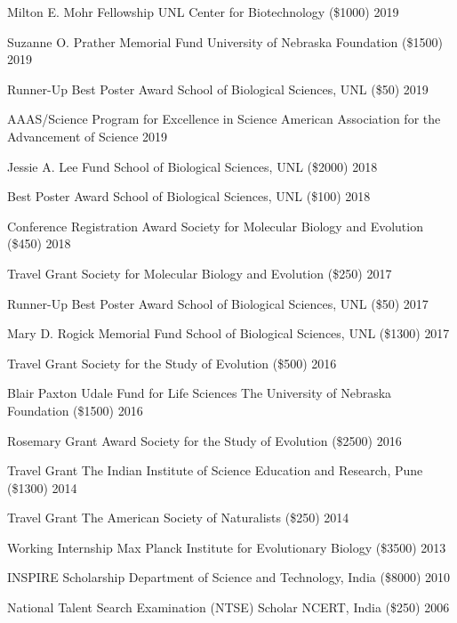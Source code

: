 
\begin{cvhonors}

  \cvhonor
    {Milton E. Mohr Fellowship}
    {UNL Center for Biotechnology (\$1000)}
    {2019}

  \cvhonor
    {Suzanne O. Prather Memorial Fund}
    {University of Nebraska Foundation (\$1500)}
    {2019}

  \cvhonor
    {Runner-Up Best Poster Award}
    {School of Biological Sciences, UNL (\$50)}
    {2019}

  \cvhonor
    {AAAS/Science Program for Excellence in Science}
    {American Association for the Advancement of Science}
    {2019}

  \cvhonor
    {Jessie A. Lee Fund} 
    {School of Biological Sciences, UNL (\$2000)}
    {2018} %

  \cvhonor
    {Best Poster Award}
    {School of Biological Sciences, UNL (\$100)}
    {2018}

  \cvhonor
    {Conference Registration Award}
    {Society for Molecular Biology and Evolution (\$450)}
    {2018}

  \cvhonor
    {Travel Grant}
    {Society for Molecular Biology and Evolution (\$250)}
    {2017}

  \cvhonor
    {Runner-Up Best Poster Award}
    {School of Biological Sciences, UNL (\$50)}
    {2017}

  \cvhonor
    {Mary D. Rogick Memorial Fund}
    {School of Biological Sciences, UNL (\$1300)}
    {2017}

  \cvhonor
    {Travel Grant}
    {Society for the Study of Evolution (\$500)}
    {2016}

  \cvhonor
    {Blair Paxton Udale Fund for Life Sciences}
    {The University of Nebraska Foundation (\$1500)}
    {2016}

  \cvhonor
    {Rosemary Grant Award}
    {Society for the Study of Evolution (\$2500)}
    {2016}

  \cvhonor
    {Travel Grant}
    {The Indian Institute of Science Education and Research, Pune (\$1300)}
    {2014}

  \cvhonor
    {Travel Grant}
    {The American Society of Naturalists (\$250)}
    {2014}

  \cvhonor
    {Working Internship}
    {Max Planck Institute for Evolutionary Biology (\$3500)}
    {2013}

  \cvhonor
    {INSPIRE Scholarship}
    {Department of Science and Technology, India (\$8000)}
    {2010}

  \cvhonor
    {National Talent Search Examination (NTSE) Scholar}
    {NCERT, India (\$250)}
    {2006}
\end{cvhonors}
